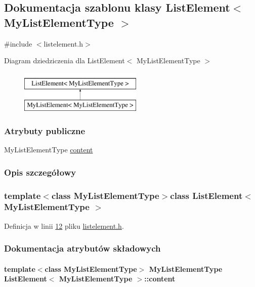 \hypertarget{class_list_element}{\subsection{Dokumentacja szablonu klasy List\-Element$<$ My\-List\-Element\-Type $>$}
\label{class_list_element}
}


{\ttfamily \#include $<$listelement.\-h$>$}

Diagram dziedziczenia dla List\-Element$<$ My\-List\-Element\-Type $>$\begin{figure}[H]
\begin{center}
\leavevmode
\includegraphics[height=2.000000cm]{class_list_element}
\end{center}
\end{figure}
\subsubsection*{Atrybuty publiczne}
\begin{DoxyCompactItemize}
\item 
My\-List\-Element\-Type \hyperlink{class_list_element_ad4ccf390c996e7a19b6dc270875276a1}{content}
\end{DoxyCompactItemize}


\subsubsection{Opis szczegółowy}
\subsubsection*{template$<$class My\-List\-Element\-Type$>$class List\-Element$<$ My\-List\-Element\-Type $>$}



Definicja w linii \hyperlink{listelement_8h_source_l00012}{12} pliku \hyperlink{listelement_8h_source}{listelement.\-h}.



\subsubsection{Dokumentacja atrybutów składowych}
\hypertarget{class_list_element_ad4ccf390c996e7a19b6dc270875276a1}{
\paragraph[{content}]{\setlength{\rightskip}{0pt plus 5cm}template$<$class My\-List\-Element\-Type$>$ My\-List\-Element\-Type {\bf List\-Element}$<$ My\-List\-Element\-Type $>$\-::content}}\label{class_list_element_ad4ccf390c996e7a19b6dc270875276a1}


